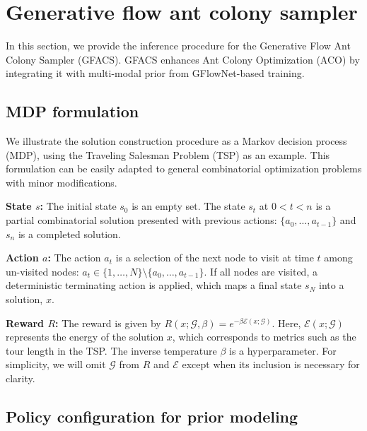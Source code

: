 \documentclass[twoside]{article}
\theoremstyle{plain}
\theoremstyle{definition}
\theoremstyle{remark}
\begin{document}
\section{Generative flow ant colony sampler}


In this section, we provide the inference procedure for the Generative Flow Ant Colony Sampler (GFACS). GFACS enhances Ant Colony Optimization (ACO) by integrating it with multi-modal prior from GFlowNet-based training.

\subsection{MDP formulation} \label{sec:mdp}

We illustrate the solution construction procedure as a Markov decision process (MDP), using the Traveling Salesman Problem (TSP) as an example. This formulation can be easily adapted to general combinatorial optimization problems with minor modifications.

\textbf{State $s$:} The initial state $s_0$ is an empty set. The state $s_t$ at $0<t<n$ is a partial combinatorial solution presented with previous actions: $\{a_0, \ldots, a_{t-1}\}$ and $s_n$ is a completed solution.

\textbf{Action $a$:} The action $a_t$ is a selection of the next node to visit at time $t$ among un-visited nodes: $a_t \in \{1,\ldots,N\}\setminus \{a_0,\ldots,a_{t-1}\}$. If all nodes are visited, a deterministic terminating action is applied, which maps a final state $s_N$ into a solution, $x$.


\textbf{Reward $R$:} The reward is given by $R(x;\mathcal{G},\beta) = e^{-\beta \mathcal{E}(x;\mathcal{G})}$. Here, $\mathcal{E}(x;\mathcal{G})$ represents the energy of the solution $x$, which corresponds to metrics such as the tour length in the TSP. The inverse temperature $\beta$ is a hyperparameter. For simplicity, we will omit $\mathcal{G}$ from $R$ and $\mathcal{E}$ except when its inclusion is necessary for clarity.

\subsection{Policy configuration for prior modeling} \label{sec:policy}
\end{document}
